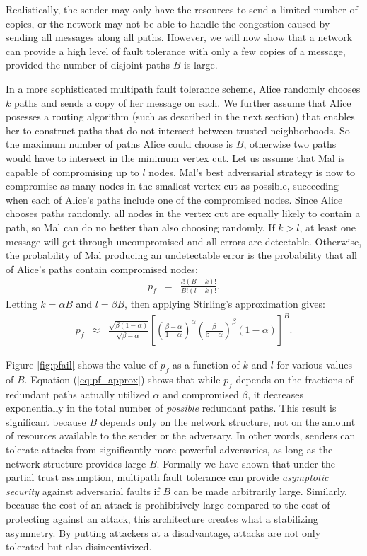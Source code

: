 \documentclass{sig-alternate-05-2015}
\newcommand{\beq}{\begin{eqnarray}}
\newcommand{\eeq}{\end{eqnarray}}
\begin{document}
Realistically, the sender may only have the resources to send a limited number of
copies, or the network may not be able to handle the congestion caused by
sending all messages along all paths.
However, we will now show that a network can provide a high level of
fault tolerance with only a few copies of a message,
provided the number of disjoint paths $B$ is large.

In a more sophisticated multipath fault tolerance scheme,
Alice randomly chooses $k$ paths and sends a copy of
her message on each.
We further assume that Alice posesses a routing algorithm
(such as described in the next section)
that enables her to construct paths that
do not intersect between trusted neighborhoods.
So the maximum number of paths Alice could choose is $B$,
otherwise two paths would have to intersect in the minimum vertex cut.
Let us assume that Mal is capable of compromising up to $l$ nodes.
Mal's best adversarial strategy is now to compromise as many nodes in the smallest
vertex cut as possible,
succeeding when each of Alice's paths include one of the compromised nodes.
Since Alice chooses paths randomly,
all nodes in the vertex cut are equally likely to contain a path,
so Mal can do no better than also choosing randomly.
If $k > l$, at least one message will get through uncompromised and all
errors are detectable.
Otherwise, the probability of Mal producing an undetectable error is
the probability that all of Alice's paths contain compromised nodes:
\beq
\label{eq:pf}
p_f &=& \frac{l!(B-k)!}{B!(l-k)!}.
\eeq
Letting $k=\alpha B$ and $l=\beta B$, then applying Stirling's
approximation gives:
\begin{eqnarray}
\label{eq:pf_approx}
p_f &\approx&
\frac{\sqrt{\beta(1-\alpha)}}{\sqrt{\beta-\alpha}}
\left[
    \left( \frac{\beta-\alpha}{1-\alpha} \right)^{\alpha}
    \left( \frac{\beta}{\beta-\alpha} \right)^{\beta}
    (1-\alpha)
\right]^B.
\end{eqnarray}

Figure \ref{fig:pfail} shows the value of $p_f$
as a function of $k$ and $l$ for various values of $B$.
Equation (\ref{eq:pf_approx}) shows that while $p_f$
depends on the fractions of
redundant paths actually utilized $\alpha$ and compromised $\beta$,
it decreases exponentially in the total number of {\em possible}
redundant paths.
This result is significant because $B$ depends only on the network structure,
not on the amount of resources available to the sender or the adversary.
In other words, senders can tolerate attacks from significantly more powerful
adversaries, as long as the network structure provides large $B$.
Formally we have shown that under the partial trust assumption,
multipath fault tolerance can provide {\em asymptotic security}
against adversarial faults if $B$ can be made arbitrarily large.
Similarly, because the cost of an attack is prohibitively large
compared to the cost of protecting against an attack,
this architecture creates what a stabilizing asymmetry.
By putting attackers at a disadvantage, attacks are not only tolerated
but also disincentivized.
\end{document}
